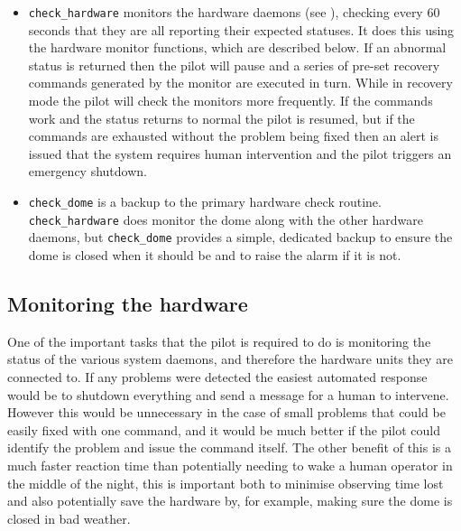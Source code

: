 \begin{colsection}
\begin{colsection}
\begin{itemize}
\item \texttt{check\_hardware} monitors the hardware daemons (see ), checking every 60 seconds that they are all reporting their expected statuses. It does this using the hardware monitor functions, which are described below. If an abnormal status is returned then the pilot will pause and a series of pre-set recovery commands generated by the monitor are executed in turn. While in recovery mode the pilot will check the monitors more frequently. If the commands work and the status returns to normal the pilot is resumed, but if the commands are exhausted without the problem being fixed then an alert is issued that the system requires human intervention and the pilot triggers an emergency shutdown.

\item \texttt{check\_dome} is a backup to the primary hardware check routine. \texttt{check\_hardware} does monitor the dome along with the other hardware daemons, but \texttt{check\_dome} provides a simple, dedicated backup to ensure the dome is closed when it should be and to raise the alarm if it is not.

\end{itemize}

\end{colsection}

\subsection{Monitoring the hardware}
\label{sec:monitors}
\begin{colsection}

One of the important tasks that the pilot is required to do is monitoring the status of the various system daemons, and therefore the hardware units they are connected to. If any problems were detected the easiest automated response would be to shutdown everything and send a message for a human to intervene. However this would be unnecessary in the case of small problems that could be easily fixed with one command, and it would be much better if the pilot could identify the problem and issue the command itself. The other benefit of this is a much faster reaction time than potentially needing to wake a human operator in the middle of the night, this is important both to minimise observing time lost and also potentially save the hardware by, for example, making sure the dome is closed in bad weather.


\end{colsection}
\end{colsection}

